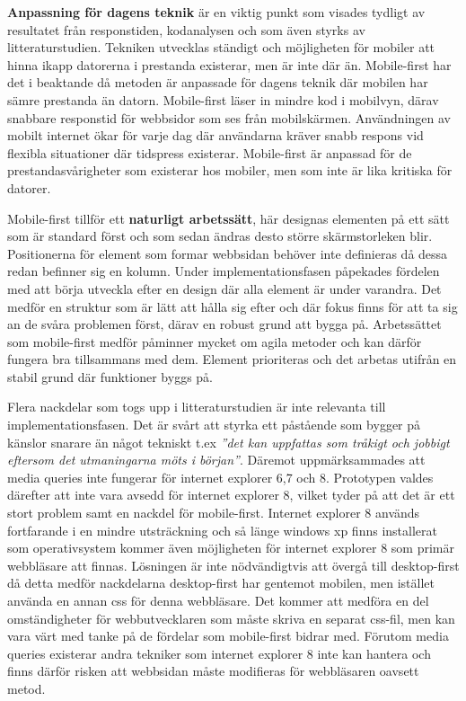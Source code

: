 \documentclass[11pt]{article}
\begin{document}
\textbf{Anpassning för dagens teknik} är en viktig punkt som visades tydligt av resultatet från responstiden, kodanalysen och som även styrks av litteraturstudien. Tekniken utvecklas ständigt och möjligheten för mobiler att hinna ikapp datorerna i prestanda existerar, men är inte där än. Mobile-first har det i beaktande då metoden är anpassade för dagens teknik där mobilen har sämre prestanda än datorn. Mobile-first läser in mindre kod i mobilvyn, därav snabbare responstid för webbsidor som ses från mobilskärmen. Användningen av mobilt internet ökar för varje dag där användarna kräver snabb respons vid flexibla situationer där tidspress existerar. Mobile-first är anpassad för de prestandasvårigheter som existerar hos mobiler, men som inte är lika kritiska för datorer. 

Mobile-first tillför ett \textbf{naturligt arbetssätt}, här designas elementen på ett sätt som är standard först och som sedan ändras desto större skärmstorleken blir. Positionerna för element som formar webbsidan behöver inte definieras då dessa redan befinner sig en kolumn. Under implementationsfasen påpekades fördelen med att börja utveckla efter en design där alla element är under varandra. Det medför en struktur som är lätt att hålla sig efter och där fokus finns för att ta sig an de svåra problemen först, därav en robust grund att bygga på. Arbetssättet som mobile-first medför påminner mycket om agila metoder och kan därför fungera bra tillsammans med dem. Element prioriteras och det arbetas utifrån en stabil grund där funktioner byggs på.

Flera nackdelar som togs upp i litteraturstudien är inte relevanta till implementationsfasen. Det är svårt att styrka ett påstående som bygger på känslor snarare än något tekniskt t.ex \textit{”det kan uppfattas som tråkigt och jobbigt eftersom det utmaningarna möts i början”}. Däremot uppmärksammades att media queries inte fungerar för internet explorer 6,7 och 8. Prototypen valdes därefter att inte vara avsedd för internet explorer 8, vilket tyder på att det är ett stort problem samt en nackdel för mobile-first. Internet explorer 8 används fortfarande i en mindre utsträckning och så länge windows xp finns installerat som operativsystem kommer även möjligheten för internet explorer 8 som primär webbläsare att finnas. Lösningen är inte nödvändigtvis att övergå till desktop-first då detta medför nackdelarna desktop-first har gentemot mobilen, men istället använda en annan css för denna webbläsare. Det kommer att medföra en del omständigheter för webbutvecklaren som måste skriva en separat css-fil, men kan vara värt med tanke på de fördelar som mobile-first bidrar med. Förutom media queries existerar andra tekniker som internet explorer 8 inte kan hantera och finns därför risken att webbsidan måste modifieras för webbläsaren oavsett metod.
\end{document}
